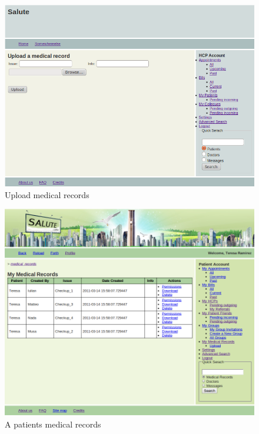\begin{figure}
\includegraphics[scale=0.6]{screenshots/upload.png}
\caption{Upload medical records}
\end{figure}

\begin{figure}
\includegraphics[scale=0.5]{screenshots/my_medical_records.png}
\caption{A patients medical records}
\end{figure}

